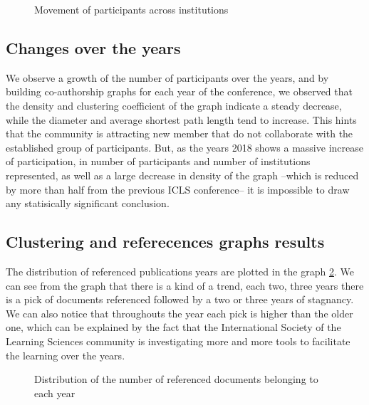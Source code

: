 \documentclass[article,twocolumn]{IEEEtran}
\begin{document}
    \begin{figure}
        \begin{center}\end{center}
        \caption{Movement of participants across institutions}
        \label{fig_move}
    \end{figure}
    
    \hypertarget{changes-over-the-years}{%
\subsection{Changes over the years}\label{changes-over-the-years}}

We observe a growth of the number of participants over the years, and by
building co-authorship graphs for each year of the conference, we
observed that the density and clustering coefficient of the graph
indicate a steady decrease, while the diameter and average shortest path
length tend to increase. This hints that the community is attracting new
member that do not collaborate with the established group of
participants. But, as the years 2018 shows a massive increase of
participation, in number of participants and number of institutions
represented, as well as a large decrease in density of the graph --which
is reduced by more than half from the previous ICLS conference-- it is
impossible to draw any statisically significant conclusion.

    \hypertarget{clustering-and-referecences-graphs-results}{%
\subsection{Clustering and referecences graphs
results}\label{clustering-and-referecences-graphs-results}}

The distribution of referenced publications years are plotted in the
graph \ref{count_ref_docs}. We can see from the graph that there is a
kind of a trend, each two, three years there is a pick of documents
referenced followed by a two or three years of stagnancy. We can also
notice that throughouts the year each pick is higher than the older one,
which can be explained by the fact that the International Society of the
Learning Sciences community is investigating more and more tools to
facilitate the learning over the years.


    \begin{figure}
        \begin{center}\end{center}
        \caption{Distribution of the number of referenced documents belonging to each year}
        \label{count_ref_docs}
    \end{figure}
    
\end{document}
